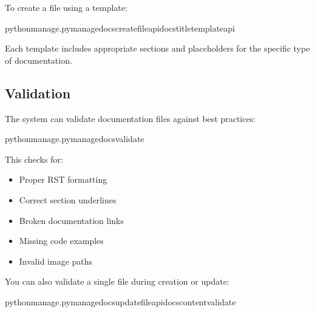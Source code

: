 \documentclass[letterpaper,10pt,english]{sphinxmanual}
\begin{document}
\sphinxAtStartPar
To create a file using a template:

\begin{sphinxVerbatim}[commandchars=\\\{\}]
pythonmanage.pymanage\PYGZus{}docscreate\PYGZhy{}\PYGZhy{}fileapi\PYGZus{}docs\PYGZhy{}\PYGZhy{}title\PYGZhy{}\PYGZhy{}templateapi
\end{sphinxVerbatim}

\sphinxAtStartPar
Each template includes appropriate sections and placeholders for the specific type of documentation.


\subsection{Validation}
\label{\detokenize{documentation_tools:validation}}
\sphinxAtStartPar
The system can validate documentation files against best practices:

\begin{sphinxVerbatim}[commandchars=\\\{\}]
pythonmanage.pymanage\PYGZus{}docsvalidate
\end{sphinxVerbatim}

\sphinxAtStartPar
This checks for:
\begin{itemize}
\item {} 
\sphinxAtStartPar
Proper RST formatting

\item {} 
\sphinxAtStartPar
Correct section underlines

\item {} 
\sphinxAtStartPar
Broken documentation links

\item {} 
\sphinxAtStartPar
Missing code examples

\item {} 
\sphinxAtStartPar
Invalid image paths

\end{itemize}

\sphinxAtStartPar
You can also validate a single file during creation or update:

\begin{sphinxVerbatim}[commandchars=\\\{\}]
pythonmanage.pymanage\PYGZus{}docsupdate\PYGZhy{}\PYGZhy{}fileapi\PYGZus{}docs\PYGZhy{}\PYGZhy{}content\PYGZhy{}\PYGZhy{}validate
\end{sphinxVerbatim}
\end{document}
